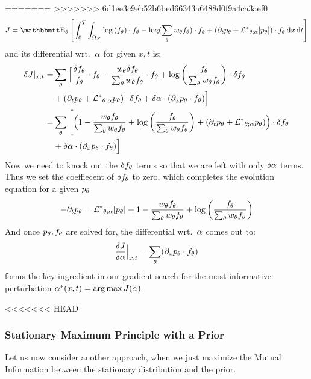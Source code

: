 \documentclass{article}
\begin{document}
=======
\def \ft {{ f_\th}}
\def \pt {{ p_\th}}
\def \dft {{ \delta f_\th}}
\def \wt {{ w_\th }}
>>>>>>> 6d1ee3c9eb52b6bed66343a6488d0f9a4ca3aef0
$$
J =  \Exp_\th
\left[ \int_0^T\int_{\O_X} \log\left(f_\th\right)\cdot \ft - 
\log(\sum_\th \wt \ft) \cdot f_\th 
 			 + 
 			 (\di_t p_\th + \Lstar_{\th;\a} [p_\th] ) \cdot f_\th
\intd{x}
\intd{t} \right]
$$
and its differential wrt.\ ${\alpha}$ for given $x,t$ is:
\begin{align*}
\delta J|_{x,t} =& \sum_\th \Big[
\frac{\dft}{\ft} \cdot \ft - \frac{  w_\th \dft }{\sum_\th w_\th\ft}\cdot \ft 
+ \log\left(\frac{f_\th} {\sum_\th \wt \ft }\right) \cdot \dft  
\\&
+  (\di_t p_\th + \Lstar_{\th;\a} p_\th ) \cdot \dft
+ \delta \a \cdot (\di_x \pt \cdot \ft)
\Big]
\\
=& \sum_\th \Bigg[\Big(
1 - \frac{  w_\th \ft }{\sum_\th w_\th\ft} 
+ \log\left(\frac{f_\th} {\sum_\th \wt \ft }\right)   
+  (\di_t p_\th + \Lstar_{\th;\a} p_\th )
\Big)  \cdot \dft 
\\
&+ \delta \a \cdot (\di_x \pt \cdot \ft)
\Big]
\end{align*}
Now we need to knock out the $\dft$ terms so that we are left with only $\delta
{\alpha}$ terms. Thus we set the coeffiecent of $\dft$ to zero, which completes the 
evolution equation for a given $p_{\theta}$
\begin{equation}
-\di_t \pt = 
\Lstar_{\th;\a} [p_\th] +  
1 - \frac{  w_\th \ft }{\sum_\th w_\th\ft} 
+ \log\left(\frac{f_\th} {\sum_\th \wt \ft }\right)   
\end{equation}
And once $\pt, \ft$ are solved for, the differential wrt.\ ${\alpha}$ comes
out to:
\begin{equation}
\frac {\delta J}{\delta \a} \Big|_{x,t} = \sum_\th (\di_x \pt \cdot \ft)
\label{eq:differential_objective_wrt_control_final}
\end{equation}
 forms the key ingredient
in our gradient search for the most informative perturbation $\a^*(x,t) =
\argmax J(\a)$.

<<<<<<< HEAD

\subsubsection{Stationary Maximum Principle with a Prior}
\label{sec:StatMP_with_a_prior}
Let us now consider another approach, when we just maximize the Mutual
Information between the stationary distribution and the prior.
\end{document}
